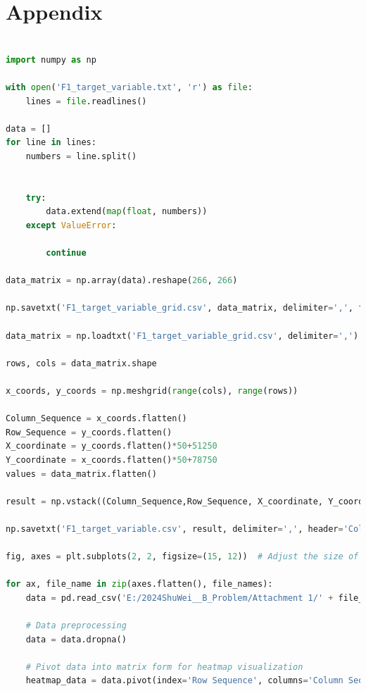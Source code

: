 \documentclass{swmcmthesis}
\begin{document}
\section*{Appendix}

\begin{lstlisting}[language=python,caption={The python programme for txt to csv and ploting for heatmaps }]

import numpy as np

with open('F1_target_variable.txt', 'r') as file:
    lines = file.readlines()

data = []
for line in lines:
    numbers = line.split()
    
    
    try:
        data.extend(map(float, numbers)) 
    except ValueError:
    
        continue

data_matrix = np.array(data).reshape(266, 266)

np.savetxt('F1_target_variable_grid.csv', data_matrix, delimiter=',', fmt='%.4f')

data_matrix = np.loadtxt('F1_target_variable_grid.csv', delimiter=',')

rows, cols = data_matrix.shape

x_coords, y_coords = np.meshgrid(range(cols), range(rows))

Column_Sequence = x_coords.flatten()
Row_Sequence = y_coords.flatten()
X_coordinate = y_coords.flatten()*50+51250
Y_coordinate = x_coords.flatten()*50+78750
values = data_matrix.flatten()

result = np.vstack((Column_Sequence,Row_Sequence, X_coordinate, Y_coordinate, values)).T

np.savetxt('F1_target_variable.csv', result, delimiter=',', header='Column Sequence,Row Sequence,X_Coordinate,Y_Coordinate,Target Property', fmt='%d, %d,%d, %d, %.4f', comments='')

fig, axes = plt.subplots(2, 2, figsize=(15, 12))  # Adjust the size of the subplots

for ax, file_name in zip(axes.flatten(), file_names):
    data = pd.read_csv('E:/2024ShuWei__B_Problem/Attachment 1/' + file_name)
    
    # Data preprocessing
    data = data.dropna()
    
    # Pivot data into matrix form for heatmap visualization
    heatmap_data = data.pivot(index='Row Sequence', columns='Column Sequence', values='Target Property')
    

\end{lstlisting}
\end{document}
